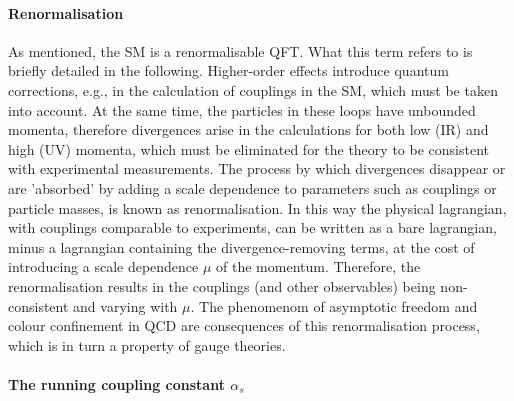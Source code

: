 \paragraph{Renormalisation}

As mentioned, the \ac{SM} is a renormalisable \ac{QFT}. What this term refers to is briefly detailed in the following. Higher-order effects introduce quantum corrections, e.g., in the calculation of couplings in the \ac{SM}, which must be taken into account. At the same time, the particles in these loops have unbounded momenta, therefore divergences arise in the calculations for both low (\ac{IR}) and high (\ac{UV}) momenta, which must be eliminated for the theory to be consistent with experimental measurements. The process by which divergences disappear or are 'absorbed' by adding a scale dependence to parameters such as couplings or particle masses, is known as renormalisation. In this way the physical lagrangian, with couplings comparable to experiments, can be written as a bare lagrangian, minus a lagrangian containing the divergence-removing terms, at the cost of introducing a scale dependence \(\mu\) of the momentum. Therefore, the renormalisation results in the couplings (and other observables) being non-consistent and varying with \(\mu\). The phenomenom of asymptotic freedom and colour confinement in \ac{QCD} are consequences of this renormalisation process, which is in turn a property of gauge theories.

\paragraph{The running coupling constant \(\alpha_s\)}

